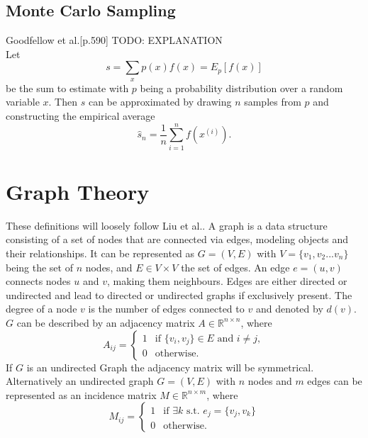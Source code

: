 \subsection{Monte Carlo Sampling}
Goodfellow et al.\cite{Goodfellow-et-al-2016}[p.590] TODO: EXPLANATION \\
Let 
\begin{equation}
    s = \sum_x p(x)f(x)=E_p[f(x)]
\end{equation}
be the sum to estimate with $p$ being a probability distribution over a random variable $x$. Then $s$ can be approximated by drawing $n$ samples from $p$ and constructing the empirical average 
\begin{equation}
    \hat{s}_n=\frac{1}{n}\sum_{i=1}^n f(x^{(i)}).
\end{equation}


\section{Graph Theory}
These definitions will loosely follow Liu et al.\cite{Liu2020}. A graph is a data structure consisting of a set of nodes that are connected via edges, modeling objects and their relationships. It can be represented as $G=(V,E)$ with $V=\{v_1,v_2...v_n\}$ being the set of $n$ nodes, and $E \in V \times V$ the set of edges. An edge $e=(u,v)$ connects nodes $u$ and $v$, making them neighbours. Edges are either directed or undirected and lead to directed or undirected graphs if exclusively present. The degree of a node $v$ is the number of edges connected to $v$ and denoted by $d(v)$. $G$ can be described by an adjacency matrix $A \in \mathbb{R}^{n \times n}$, where
\begin{equation*}
    A_{ij}=\begin{cases}
        1 & \text{if } \{v_i,v_j\}\in E \text{ and } i \neq j, \\
        0 & \text{otherwise.}
    \end{cases}
\end{equation*}
If $G$ is an undirected Graph the adjacency matrix will be symmetrical. \\
Alternatively an undirected graph $ G=(V, E)$ with $n$ nodes and $m$ edges can be represented as an incidence matrix $M \in \mathbb{R}^{n \times m}$, where
\begin{equation*}
    M_{ij}=\begin{cases}
        1 & \text{if } \exists k \text{ s.t. } e_j = \{v_j, v_k\} \\
        0 & \text{otherwise.}
    \end{cases}
\end{equation*}
